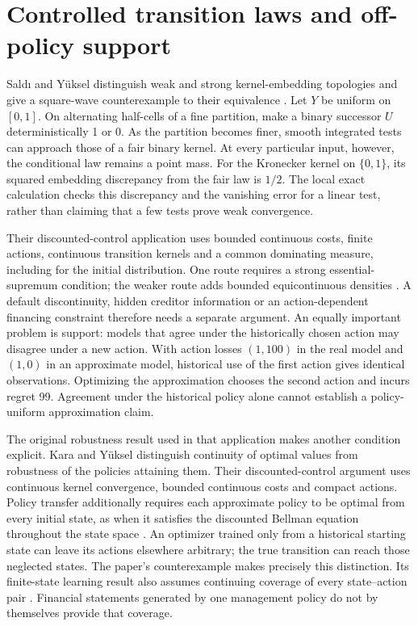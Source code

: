 \section{Controlled transition laws and off-policy support}
Sald\i{} and Y\"uksel distinguish weak and strong kernel-embedding topologies
and give a square-wave counterexample to their equivalence
\cite[Theorem~4.1 and proof]{litclosekerneltop}. Let $Y$ be uniform on $[0,1]$.
On alternating half-cells of a fine partition, make a binary successor $U$
deterministically 1 or 0. As the partition becomes finer, smooth integrated
tests can approach those of a fair binary kernel. At every particular input,
however, the conditional law remains a point mass. For the Kronecker kernel
on $\{0,1\}$, its squared embedding discrepancy from the fair law is $1/2$.
The local exact calculation checks this discrepancy and the vanishing error
for a linear test, rather than claiming that a few tests prove weak convergence.

Their discounted-control application uses bounded continuous costs, finite
actions, continuous transition kernels and a common dominating measure, including
for the initial distribution. One route requires a strong essential-supremum
condition; the weaker route adds bounded equicontinuous densities
\cite[Assumptions~2--4, equation~(11), Theorems~5.1--5.2]{litclosekerneltop}.
A default discontinuity, hidden creditor information or an action-dependent
financing constraint therefore needs a separate argument. An equally important
problem is support: models that agree under the historically chosen action may
disagree under a new action. With action losses $(1,100)$ in the real model and
$(1,0)$ in an approximate model, historical use of the first action gives
identical observations. Optimizing the approximation chooses the second action
and incurs regret 99. Agreement under the historical policy alone cannot
establish a policy-uniform approximation claim.

The original robustness result used in that application makes another condition
explicit. Kara and Y\"uksel distinguish continuity of optimal values from
robustness of the policies attaining them. Their discounted-control argument
uses continuous kernel convergence, bounded continuous costs and compact
actions. Policy transfer additionally requires each approximate policy to be
optimal from every initial state, as when it satisfies the discounted Bellman
equation throughout the state space
\cite[Assumption~1.1, Theorems~4.2--4.4 and Appendix~A.5]{litclosekara}.
An optimizer trained only from a historical starting state can leave its actions
elsewhere arbitrary; the true transition can reach those neglected states.
The paper's counterexample makes precisely this distinction. Its finite-state
learning result also assumes continuing coverage of every state--action pair
\cite[Corollary~5.1]{litclosekara}. Financial statements generated by one management
policy do not by themselves provide that coverage.
